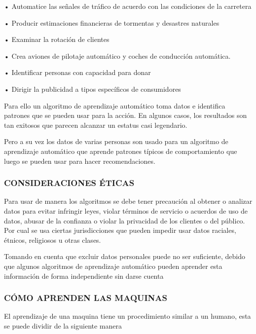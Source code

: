 \documentclass[
  letterpaper,
  DIV=11,
  numbers=noendperiod]{scrartcl}
\begin{document}
• Automatice las señales de tráfico de acuerdo con las condiciones de la
carretera

• Producir estimaciones financieras de tormentas y desastres naturales

• Examinar la rotación de clientes

• Crea aviones de pilotaje automático y coches de conducción automática.

• Identificar personas con capacidad para donar

• Dirigir la publicidad a tipos específicos de consumidores

Para ello un algoritmo de aprendizaje automático toma datos e identifica
patrones que se pueden usar para la acción. En algunos casos, los
resultados son tan exitosos que parecen alcanzar un estatus casi
legendario.

Pero a su vez los datos de varias personas son usado para un algoritmo
de aprendizaje automático que aprende patrones típicos de comportamiento
que luego se pueden usar para hacer recomendaciones.

\hypertarget{consideraciones-uxe9ticas}{%
\subsubsection{\texorpdfstring{\textbf{CONSIDERACIONES
ÉTICAS}}{CONSIDERACIONES ÉTICAS}}\label{consideraciones-uxe9ticas}}

Para usar de manera los algoritmos se debe tener precaución al obtener o
analizar datos para evitar infringir leyes, violar términos de servicio
o acuerdos de uso de datos, abusar de la confianza o violar la
privacidad de los clientes o del público. Por cual se usa ciertas
jurisdicciones que pueden impedir usar datos raciales, étnicos,
religiosos u otras clases.

Tomando en cuenta que excluir datos personales puede no ser suficiente,
debido que algunos algoritmos de aprendizaje automático pueden aprender
esta información de forma independiente sin darse cuenta

\hypertarget{cuxf3mo-aprenden-las-maquinas}{%
\subsubsection{\texorpdfstring{\textbf{CÓMO APRENDEN LAS
MAQUINAS}}{CÓMO APRENDEN LAS MAQUINAS}}\label{cuxf3mo-aprenden-las-maquinas}}

El aprendizaje de una maquina tiene un procedimiento similar a un
humano, esta se puede dividir de la siguiente manera
\end{document}
